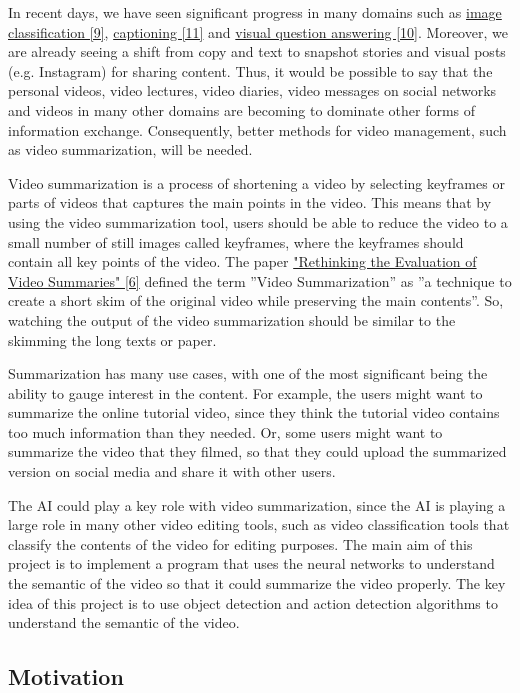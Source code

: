 \documentclass{article}
\begin{document}
In recent days, we have seen significant progress in many domains such as \hyperlink{ref9}{image classification [9]}, \hyperlink{ref11}{captioning [11]} and \hyperlink{ref10}{visual question answering [10]}. Moreover, we are already seeing a shift from copy and text to snapshot stories and visual posts (e.g. Instagram) for sharing content. Thus, it would be possible to say that the personal videos, video lectures, video diaries, video messages on social networks and videos in many other domains are becoming to dominate other forms of information exchange. Consequently, better methods for video management, such as video summarization, will be needed. 

Video summarization is a process of shortening a video by selecting keyframes or parts of videos that captures the main points in the video. This means that by using the video summarization tool, users should be able to reduce the video to a small number of still images called keyframes, where the keyframes should contain all key points of the video. The paper \hyperlink{ref6}{"Rethinking the Evaluation of Video Summaries" [6]} defined the term ”Video Summarization” as ”a technique to create a short skim of the original video while preserving the main contents”. So, watching the output of the video summarization should be similar to the skimming the long texts or paper.

Summarization has many use cases, with one of the most significant being the ability to gauge interest in the content. For example, the users might want to summarize the online tutorial video, since they think the tutorial video contains too much information than they needed. Or, some users might want to summarize the video that they filmed, so that they could upload the summarized version on social media and share it with other users.

The AI could play a key role with video summarization, since the AI is playing a large role in many other video editing tools, such as video classification tools that classify the contents of the video for editing purposes. The main aim of this project is to implement a program that uses the neural networks to understand the semantic of the video so that it could summarize the video properly. The key idea of this project is to use object detection and action detection algorithms to understand the semantic of the video.


\subsection{Motivation}
\end{document}
